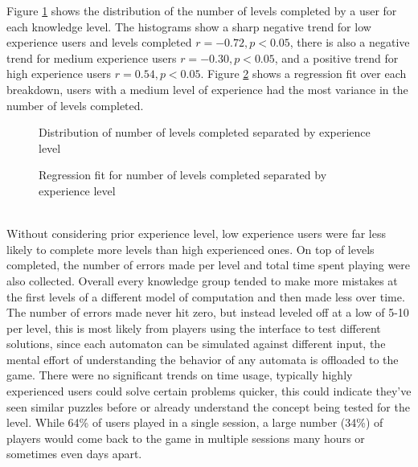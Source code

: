 \documentclass[letterpaper,man,natbib,floatsintext]{apa7}  %
\begin{document}
Figure \ref{fig:dist_1} shows the distribution of the number of levels completed by a user for each knowledge level. The histograms show a sharp negative trend for low experience users and levels completed $r = -0.72, p < 0.05$, there is also a negative trend for 
medium experience users $r = -0.30, p < 0.05$, and a positive trend for high experience users $r=0.54, p < 0.05$.
Figure \ref{fig:dist_2} shows a regression fit over each breakdown, users with a medium level of experience had the most variance in the number of levels completed.
\begin{figure}[h!]
	\centering
	\caption{Distribution of number of levels completed separated by experience level}
	\label{fig:dist_1}
\end{figure}
\begin{figure}[h!]
	\centering
	\caption{Regression fit for number of levels completed separated by experience level}
	\label{fig:dist_2}
\end{figure}\\
Without considering prior experience level, low experience users were far less likely to complete more levels than high experienced ones. On top of levels completed, the number of errors made per level and total time spent playing were also collected. Overall every knowledge group tended to make more mistakes at the first levels of a different model of computation and then made less over time. The number of errors made never hit zero, but instead leveled off at a low
of 5-10 per level, this is most likely from players using the interface to test different solutions, since each automaton can be simulated against different input, the mental effort of understanding the behavior of any automata is offloaded to the game.
There were no significant trends on time usage, typically highly experienced users could solve certain problems quicker, this could indicate they've seen similar puzzles before or already understand the concept being tested for the level. While 64\% of users played in a single session, a large number (34\%) of players would come back to the game in multiple sessions many hours or sometimes even days apart.
\end{document}
